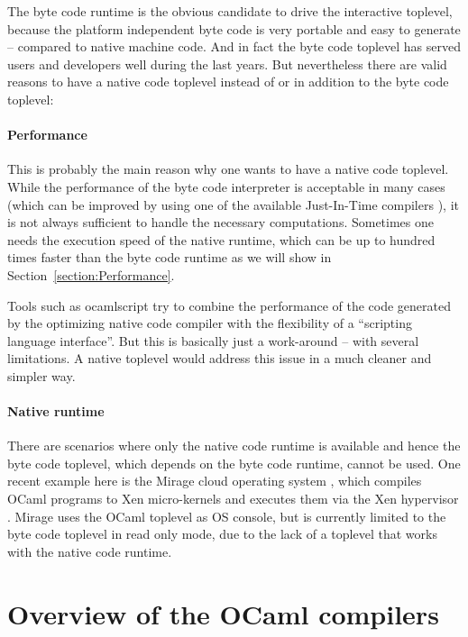 \documentclass[10pt,a4paper,draft,twocolumn]{article}
\begin{document}
The byte code runtime is the obvious candidate to drive the interactive toplevel, because the platform
independent byte code is very portable and easy to generate -- compared to native machine code. And in
fact the byte code toplevel has served users and developers well during the last years. But nevertheless
there are valid reasons to have a native code toplevel instead of or in addition to the byte code toplevel:

\paragraph{Performance}

This is probably the main reason why one wants to have a native code toplevel. While the performance of
the byte code interpreter is acceptable in many cases (which can be improved by using one of the
available Just-In-Time compilers \cite{Meurer10ocamljit,Meurer10jit,Meurer11ocamljit2,Starynkevitch04}),
it is not always sufficient to handle the necessary computations. Sometimes one needs the execution
speed of the native runtime, which can be up to hundred times faster than the byte code runtime as we will
show in Section~\ref{section:Performance}.

Tools such as ocamlscript \cite{ocamlscript11} try to combine the performance of the code generated by
the optimizing native code compiler with the flexibility of a ``scripting language interface''. But this
is basically just a work-around -- with several limitations. A native toplevel would address this issue in
a much cleaner and simpler way.

\paragraph{Native runtime}

There are scenarios where only the native code runtime is available and hence the byte code toplevel,
which depends on the byte code runtime, cannot be used. One recent example here is the Mirage cloud
operating system \cite{Mirage11,Madhavapeddy10,Madhavapeddy10hotcloud}, which compiles OCaml programs
to Xen micro-kernels \cite{Barham03} and executes them via the Xen hypervisor \cite{Xen11}. Mirage
uses the OCaml toplevel as OS console, but is currently limited to the byte code toplevel in read
only mode, due to the lack of a toplevel that works with the native code runtime.


\section{Overview of the OCaml compilers} \label{section:Overview_of_the_OCaml_compilers}
\end{document}
